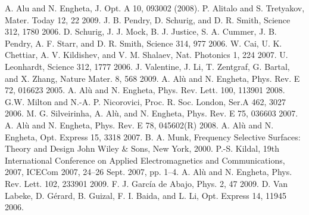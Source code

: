 \documentclass[12pt,a4paper]{article}
\begin{document}
\begin{thebibliography}{99}
A. Alu and N. Engheta, J. Opt. A 10, 093002 (2008).
P. Alitalo and S. Tretyakov, Mater. Today 12, 22 2009.
J. B. Pendry, D. Schurig, and D. R. Smith, Science 312, 1780 2006.
D. Schurig, J. J. Mock, B. J. Justice, S. A. Cummer, J. B. Pendry, A. F. Starr, 
and D. R. Smith, Science 314, 977 2006.
W. Cai, U. K. Chettiar, A. V. Kildishev, and V. M. Shalaev, Nat.
Photonics 1, 224 2007.
U. Leonhardt, Science 312, 1777 2006.
J. Valentine, J. Li, T. Zentgraf, G. Bartal, and X. Zhang, Nature
Mater. 8, 568 2009.
A. Alù and N. Engheta, Phys. Rev. E 72, 016623 2005.
A. Alù and N. Engheta, Phys. Rev. Lett. 100, 113901 2008.
G.W. Milton and N.-A. P. Nicorovici, Proc. R. Soc. London, Ser.A 462, 3027 
2006.
M. G. Silveirinha, A. Alù, and N. Engheta, Phys. Rev. E 75,
036603 2007.
A. Alù and N. Engheta, Phys. Rev. E 78, 045602(R) 2008.
A. Alù and N. Engheta, Opt. Express 15, 3318 2007.
B. A. Munk, Frequency Selective Surfaces: Theory and Design John Wiley \& Sons,
 New York, 2000.
P.-S. Kildal, 19th International Conference on Applied Electromagnetics
and Communications, 2007, ICECom 2007, 24–26 Sept. 2007, pp. 1–4.
A. Alù and N. Engheta, Phys. Rev. Lett. 102, 233901 2009.
F. J. García de Abajo, Phys. 2, 47 2009.
D. Van Labeke, D. Gérard, B. Guizal, F. I. Baida, and L. Li, Opt.
Express 14, 11945 2006.
\end{thebibliography}
\end{document}
